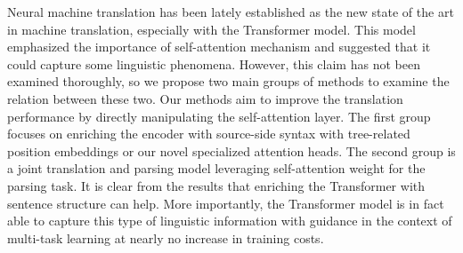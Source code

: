 \documentclass[12pt]{article}
\begin{document}
Neural machine translation has been lately established as the new state of the art in machine translation, especially with the Transformer model. This model emphasized the importance of self-attention mechanism and suggested that it could capture some linguistic phenomena. However, this claim has not been examined thoroughly, so we propose two main groups of methods to examine the relation between these two. Our methods aim to improve the translation performance by directly manipulating the self-attention layer. The first group focuses on enriching the encoder with source-side syntax with tree-related position embeddings or our novel specialized attention heads. The second group is a joint translation and parsing model leveraging self-attention weight for the parsing task. It is clear from the results that enriching the Transformer with sentence structure can help. More importantly, the Transformer model is in fact able to capture this type of linguistic information with guidance in the context of multi-task learning at nearly no increase in training costs.
\end{document}
